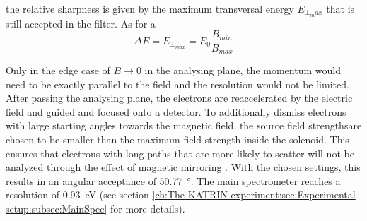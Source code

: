 		the relative sharpness is given by the maximum transversal energy $E_{\bot_max}$ that is still accepted in the filter. As for a 
		\begin{equation}
		\Delta E = E_{\bot_{max}} = E_{0}\frac{B_{min}}{B_{max}}
		\end{equation}
		
		Only in the edge case of $B\rightarrow 0$ in the analysing plane, the momentum would need to be exactly parallel to the field and the resolution would not be limited.
		After passing the analysing plane, the electrons are reaccelerated by the electric field and guided and focused onto a detector.
		To additionally dismiss electrons with large starting angles towards the magnetic field, the source field strengthsare chosen to be smaller than the maximum field strength inside the solenoid. This ensures that electrons with long paths that are more likely to scatter will not be analyzed through the effect of magnetic mirroring \cite{magneticMirror}.
		With the chosen settings, this results in an angular acceptance of \SI{50.77}{\degree}. The main spectrometer reaches a resolution of \SI{0.93}{\electronvolt} (see section \ref{ch:The KATRIN experiment:sec:Experimental setup:subsec:MainSpec} for more details).
%       

      

